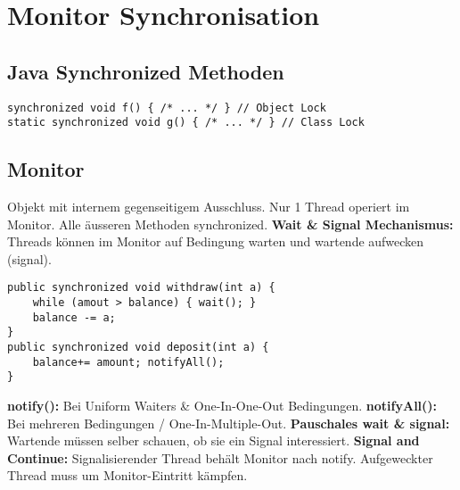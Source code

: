 
\section{Monitor Synchronisation}
\subsection{Java Synchronized Methoden}
\begin{lstlisting}
synchronized void f() { /* ... */ } // Object Lock
static synchronized void g() { /* ... */ } // Class Lock
\end{lstlisting}

\subsection{Monitor}
Objekt mit internem gegenseitigem Ausschluss. Nur 1 Thread operiert im Monitor. Alle äusseren Methoden synchronized.
\textbf{Wait \& Signal Mechanismus:} Threads können im Monitor auf Bedingung warten und wartende aufwecken (signal).

\begin{lstlisting}
public synchronized void withdraw(int a) {
    while (amout > balance) { wait(); }
    balance -= a;
}
public synchronized void deposit(int a) {
    balance+= amount; notifyAll();
}
\end{lstlisting}
\textbf{notify():} Bei Uniform Waiters \& One-In-One-Out Bedingungen.
\textbf{notifyAll():} Bei mehreren Bedingungen / One-In-Multiple-Out. 
\textbf{Pauschales wait \& signal:} Wartende müssen selber schauen, ob sie ein Signal interessiert.
\textbf{Signal and Continue:} Signalisierender Thread behält Monitor nach notify. Aufgeweckter Thread muss um Monitor-Eintritt kämpfen.